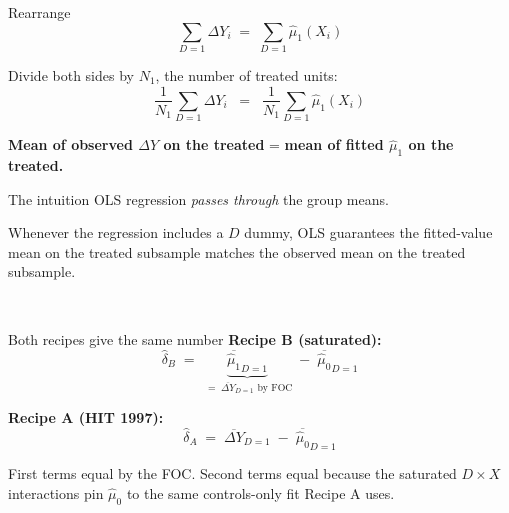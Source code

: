 \documentclass[aspectratio=169,11pt]{beamer}
\begin{document}
\begin{frame}{Rearrange}
\footnotesize
\[
\sum_{D=1} \Delta Y_i \;=\; \sum_{D=1} \widehat\mu_1(X_i)
\]

\vspace{0.6em}
Divide both sides by $N_1$, the number of treated units:
\vspace{0.2em}
\[
\boxed{\;\;\frac{1}{N_1}\sum_{D=1} \Delta Y_i \;\;=\;\; \frac{1}{N_1}\sum_{D=1} \widehat\mu_1(X_i)\;\;}
\]

\vspace{0.7em}
\textbf{Mean of observed $\Delta Y$ on the treated} \;\;=\;\; \textbf{mean of fitted $\widehat\mu_1$ on the treated.}

\vspace{0.4em}
\end{frame}

\begin{frame}{The intuition}
\footnotesize
OLS regression \textit{passes through} the group means.

\vspace{0.6em}
Whenever the regression includes a $D$ dummy, OLS guarantees the fitted-value mean on the treated subsample matches the observed mean on the treated subsample.

\vspace{0.8em}
\begin{center}
 \\[0.4em]
\end{center}

\vspace{0.6em}
\end{frame}

\begin{frame}{Both recipes give the same number}
\footnotesize
\textbf{Recipe B (saturated):}
\[
\widehat\delta_B \;=\; \underbrace{\overline{\widehat\mu_1}_{D=1}}_{\;=\;\overline{\Delta Y}_{D=1}\text{ by FOC}} \;-\; \overline{\widehat\mu_0}_{D=1}
\]

\vspace{0.5em}
\textbf{Recipe A (HIT 1997):}
\[
\widehat\delta_A \;=\; \overline{\Delta Y}_{D=1} \;-\; \overline{\widehat\mu_0}_{D=1}
\]

\vspace{0.5em}
First terms equal by the FOC. \;Second terms equal because the saturated $D \times X$ interactions pin $\widehat\mu_0$ to the same controls-only fit Recipe A uses.

\vspace{0.5em}
\begin{center}
\end{center}
\end{frame}
\end{document}
